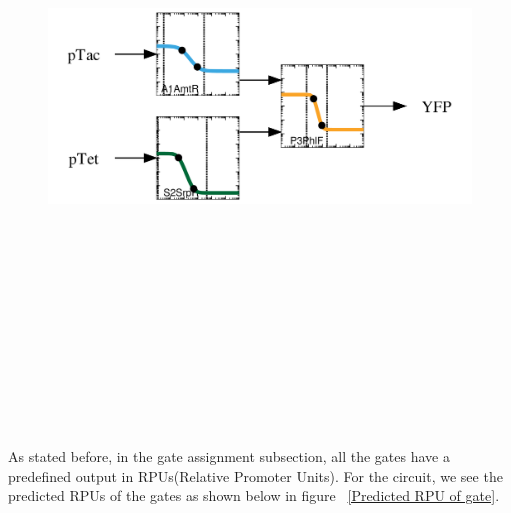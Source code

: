 \documentclass[11pt]{article}
\begin{document}
\begin{figure}[ht!]
\centering
\includegraphics[width=16cm,height=16cm,keepaspectratio]{ex_response.png}
\label{Response function for gate assignment}
\end{figure}
\\[\baselineskip]   
As stated before, in the gate assignment subsection, all the gates have a  predefined output in RPUs(Relative Promoter Units). For the circuit, we see the predicted RPUs of the gates as shown below in figure ~\ref{Predicted RPU of gate}.
\end{document}
